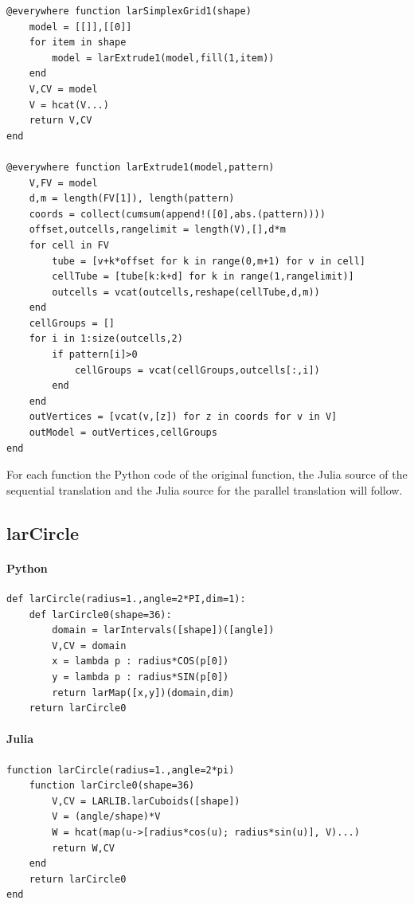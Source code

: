 \documentclass{article}
\begin{document}
\begin{verbatim}
@everywhere function larSimplexGrid1(shape)
    model = [[]],[[0]]
    for item in shape
        model = larExtrude1(model,fill(1,item))
    end
    V,CV = model
    V = hcat(V...)
    return V,CV
end

@everywhere function larExtrude1(model,pattern)
    V,FV = model
    d,m = length(FV[1]), length(pattern)
    coords = collect(cumsum(append!([0],abs.(pattern))))
    offset,outcells,rangelimit = length(V),[],d*m
    for cell in FV  
        tube = [v+k*offset for k in range(0,m+1) for v in cell]
        cellTube = [tube[k:k+d] for k in range(1,rangelimit)]
        outcells = vcat(outcells,reshape(cellTube,d,m))
    end
    cellGroups = []
    for i in 1:size(outcells,2)
        if pattern[i]>0
            cellGroups = vcat(cellGroups,outcells[:,i])
        end
    end
    outVertices = [vcat(v,[z]) for z in coords for v in V]
    outModel = outVertices,cellGroups
end
\end{verbatim}

For each function  the Python code of the original function, the Julia source of the sequential translation and the Julia source for the parallel translation will follow.

\subsection{larCircle}

\paragraph{Python}
\begin{Verbatim}[tabsize=4]
def larCircle(radius=1.,angle=2*PI,dim=1):
	def larCircle0(shape=36):
        domain = larIntervals([shape])([angle])
        V,CV = domain
        x = lambda p : radius*COS(p[0])
        y = lambda p : radius*SIN(p[0])
        return larMap([x,y])(domain,dim)
    return larCircle0	
\end{Verbatim}

\paragraph{Julia}
\begin{verbatim}
function larCircle(radius=1.,angle=2*pi)
    function larCircle0(shape=36)
        V,CV = LARLIB.larCuboids([shape])
        V = (angle/shape)*V
        W = hcat(map(u->[radius*cos(u); radius*sin(u)], V)...)
        return W,CV
    end
    return larCircle0
end
\end{verbatim}
\end{document}
